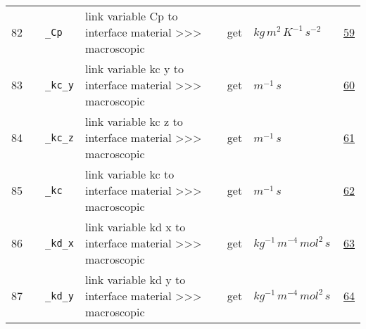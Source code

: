 \begin{longtable}{|p{1cm}|p{2.5cm}|p{4.5cm}|p{8cm}|p{3.0cm}|p{3cm}|p{1cm}|}
                 \\
        82
             & \hypertarget{"v:82"}{ $ {} $}
             & \verb|_Cp|
             & link variable Cp to interface material >>> macroscopic
             & \begin{lay}get \end{lay}
             & $ kg \,m^{2} \,K^{-1} \,s^{-2} \, $
             &                 \hyperlink{"e:59"}{ 59 }
                 \\
        83
             & \hypertarget{"v:83"}{ $ {} $}
             & \verb|_kc_y|
             & link variable kc y to interface material >>> macroscopic
             & \begin{lay}get \end{lay}
             & $ m^{-1} \,s \, $
             &                 \hyperlink{"e:60"}{ 60 }
                 \\
        84
             & \hypertarget{"v:84"}{ $ {} $}
             & \verb|_kc_z|
             & link variable kc z to interface material >>> macroscopic
             & \begin{lay}get \end{lay}
             & $ m^{-1} \,s \, $
             &                 \hyperlink{"e:61"}{ 61 }
                 \\
        85
             & \hypertarget{"v:85"}{ $ {} $}
             & \verb|_kc|
             & link variable kc to interface material >>> macroscopic
             & \begin{lay}get \end{lay}
             & $ m^{-1} \,s \, $
             &                 \hyperlink{"e:62"}{ 62 }
                 \\
        86
             & \hypertarget{"v:86"}{ $ {} $}
             & \verb|_kd_x|
             & link variable kd x to interface material >>> macroscopic
             & \begin{lay}get \end{lay}
             & $ kg^{-1} \,m^{-4} \,mol^{2} \,s \, $
             &                 \hyperlink{"e:63"}{ 63 }
                 \\
        87
             & \hypertarget{"v:87"}{ $ {} $}
             & \verb|_kd_y|
             & link variable kd y to interface material >>> macroscopic
             & \begin{lay}get \end{lay}
             & $ kg^{-1} \,m^{-4} \,mol^{2} \,s \, $
             &                 \hyperlink{"e:64"}{ 64 }

\end{longtable}
